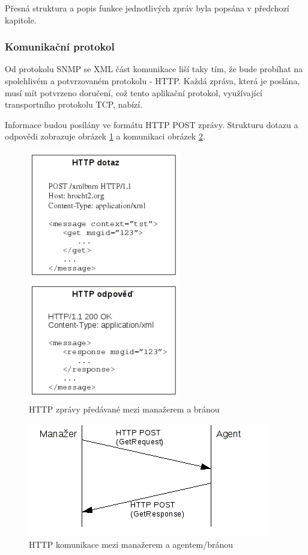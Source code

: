 Přesná struktura a popis funkce jednotlivých zpráv byla popsána v předchozí kapitole.


\subsubsection*{Komunikační protokol}
Od protokolu SNMP se XML část komunikace liší taky tím, že bude probíhat na spolehlivém a potvrzovaném protokolu - HTTP. Každá zpráva, která
je poslána, musí mít potvrzeno doručení, což tento aplikační protokol, využívající transportního protokolu TCP, nabízí. 

Informace budou posílány ve formátu HTTP POST zprávy. Strukturu dotazu a odpovědi zobrazuje obrázek \ref{obr_an_http_post} a komunikaci obrázek \ref{obr_an_http_request}.

\begin{figure}[htp]
	\begin{center}
		\includegraphics{obrazky/04_http_post.png}
		\caption{HTTP zprávy předávané mezi manažerem a bránou}
		\label{obr_an_http_post}
	\end{center}
\end{figure}

\begin{figure}[htp]
	\begin{center}
		\includegraphics{obrazky/04_http_request.png}
		\caption{HTTP komunikace mezi manažerem a agentem/bránou}
		\label{obr_an_http_request}
	\end{center}
\end{figure}

